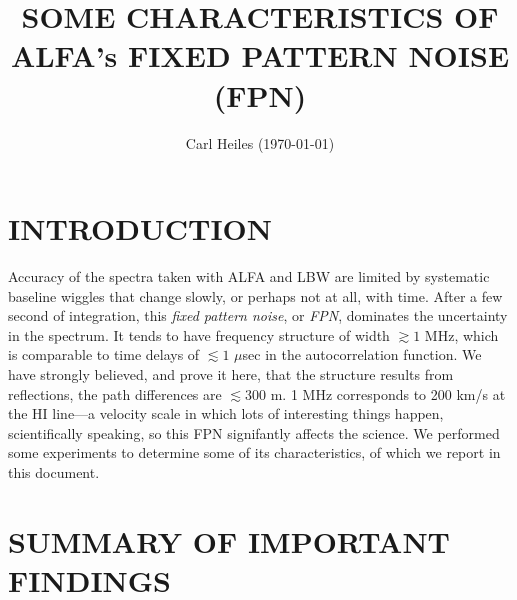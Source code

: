\documentclass[psfig,preprint]{aastex}
\begin{document}
                                                                                
\title{SOME CHARACTERISTICS OF ALFA's FIXED PATTERN NOISE (FPN)}

\author{Carl Heiles (\today)}

\tableofcontents

\clearpage

\section{INTRODUCTION}

	Accuracy of the spectra taken with ALFA and LBW are limited by
systematic baseline wiggles that change slowly, or perhaps not at all,
with time.  After a few second of integration, this {\it fixed pattern
noise}, or {\it FPN}, dominates the uncertainty in the spectrum.  It
tends to have frequency structure of width $\gtrsim 1$ MHz, which is
comparable to time delays of $\lesssim 1$ $\mu$sec in the
autocorrelation function.  We have strongly believed, and prove it here,
that the structure results from reflections, the path differences are
$\lesssim 300$ m.  1 MHz corresponds to 200 km/s at the HI line---a
velocity scale in which lots of interesting things happen,
scientifically speaking, so this FPN signifantly affects the science. 
We performed some experiments to determine some of its characteristics,
of which we report in this document. 

\section{SUMMARY OF IMPORTANT FINDINGS}
\end{document}
